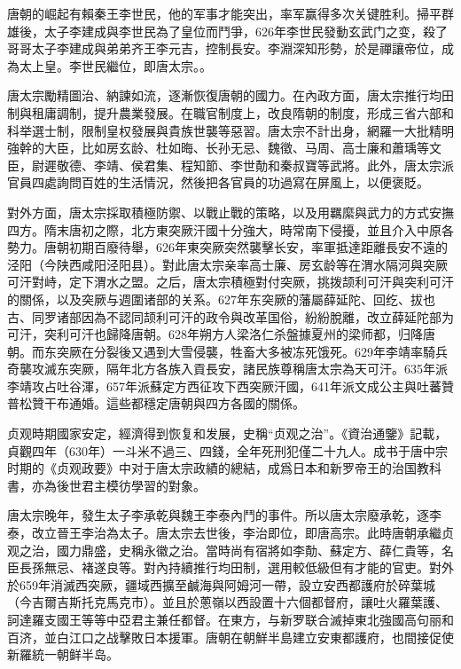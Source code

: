 唐朝的崛起有賴秦王李世民，他的军事才能突出，率军赢得多次关键胜利。掃平群雄後，太子李建成與李世民為了皇位而鬥爭，626年李世民發動玄武门之变，殺了哥哥太子李建成與弟弟齐王李元吉，控制長安。李淵深知形勢，於是禪讓帝位，成為太上皇。李世民繼位，即唐太宗。。

唐太宗勵精圖治、納諫如流，逐漸恢復唐朝的國力。在內政方面，唐太宗推行均田制與租庸調制，提升農業發展。在職官制度上，改良隋朝的制度，形成三省六部和科举選士制，限制皇权發展與貴族世襲等惡習。唐太宗不計出身，網羅一大批精明強幹的大臣，比如房玄龄、杜如晦、长孙无忌、魏徵、马周、高士廉和蕭瑀等文臣，尉遲敬德、李靖、侯君集、程知節、李世勣和秦叔寶等武將。此外，唐太宗派官員四處詢問百姓的生活情況，然後把各官員的功過寫在屏風上，以便褒貶。

對外方面，唐太宗採取積極防禦、以戰止戰的策略，以及用羈縻與武力的方式安撫四方。隋末唐初之際，北方東突厥汗國十分強大，時常南下侵擾，並且介入中原各勢力。唐朝初期百廢待舉，626年東突厥突然襲擊长安，率軍抵達距離長安不遠的泾阳（今陕西咸阳泾阳县）。對此唐太宗亲率高士廉、房玄龄等在渭水隔河與突厥可汗對峙，定下渭水之盟。之后，唐太宗積極對付突厥，挑拨颉利可汗與突利可汗的關係，以及突厥与週圍诸部的关系。627年东突厥的藩屬薛延陀、回纥、拔也古、同罗诸部因為不認同颉利可汗的政令與改革国俗，紛紛脫離，改立薛延陀部为可汗，突利可汗也歸降唐朝。628年朔方人梁洛仁杀盤據夏州的梁师都，归降唐朝。而东突厥在分裂後又遇到大雪侵襲，牲畜大多被冻死饿死。629年李靖率騎兵奇襲攻滅东突厥，隔年北方各族入貢長安，諸民族尊稱唐太宗為天可汗。635年派李靖攻占吐谷渾，657年派蘇定方西征攻下西突厥汗國，641年派文成公主與吐蕃贊普松贊干布通婚。這些都穩定唐朝與四方各國的關係。

贞观時期國家安定，經濟得到恢复和发展，史稱“贞观之治”。《資治通鑒》記載，貞觀四年（630年）一斗米不過三、四錢，全年死刑犯僅二十九人。成书于唐中宗时期的《贞观政要》中对于唐太宗政績的總結，成爲日本和新罗帝王的治国教科書，亦為後世君主模彷學習的對象。

唐太宗晚年，發生太子李承乾與魏王李泰內鬥的事件。所以唐太宗廢承乾，逐李泰，改立晉王李治為太子。唐太宗去世後，李治即位，即唐高宗。此時唐朝承繼贞观之治，國力鼎盛，史稱永徽之治。當時尚有宿將如李勣、蘇定方、薛仁貴等，名臣長孫無忌、褚遂良等。對內持續推行均田制，選用較低級但有才能的官吏。對外於659年消滅西突厥，疆域西擴至鹹海與阿姆河一帶，設立安西都護府於碎葉城（今吉爾吉斯托克馬克市）。並且於蔥嶺以西設置十六個都督府，讓吐火羅葉護、訶達羅支國王等等中亞君主兼任都督。在東方，与新罗联合滅掉東北強國高句丽和百济，並白江口之战擊敗日本援軍。唐朝在朝鮮半島建立安東都護府，也間接促使新羅統一朝鲜半岛。

